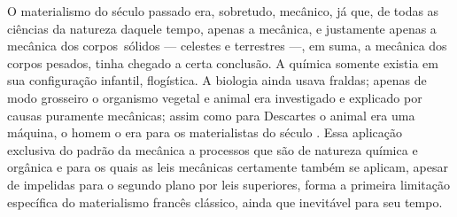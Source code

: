 O materialismo do século passado era, sobretudo, mecânico, já que, de
todas as ciências da natureza daquele tempo, apenas a mecânica, e
justamente apenas a mecânica dos corpos\est\ sólidos --- celestes e terrestres ---,
em suma, a mecânica dos corpos pesados, tinha chegado a certa conclusão.
A química somente existia em sua configuração infantil, flogística.
A biologia ainda
usava fraldas; apenas de modo grosseiro o organismo vegetal e animal
era investigado e explicado por causas puramente mecânicas; assim
como
para Descartes o
animal era uma máquina, o homem o era para os materialistas do século
. Essa aplicação exclusiva do padrão da mecânica a processos que
são de natureza química e orgânica e para os quais as leis mecânicas
certamente também se aplicam, apesar de impelidas para o segundo plano
por leis superiores, forma a primeira limitação específica do
materialismo francês clássico, ainda que inevitável para seu tempo.


